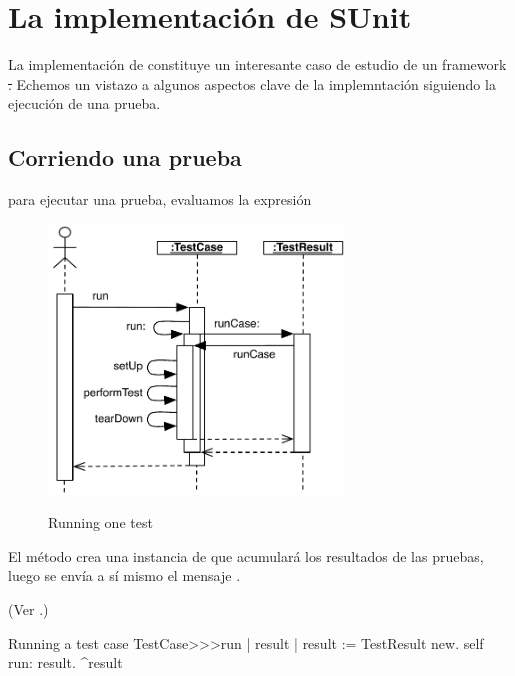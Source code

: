 \documentclass[a4paper,10pt,twoside]{book}
\begin{document}
\section{La implementaci\'on de SUnit}

La implementaci\'on de \sunit constituye un interesante caso de estudio de un framework \st. 
Echemos un vistazo a algunos aspectos clave de la implemntaci\'on siguiendo la ejecuci\'on de una prueba.

\subsection{Corriendo una prueba}

para ejecutar una prueba, evaluamos la expresi\'on


\begin{figure}[tbh]
  \begin{center}
		{\includegraphics[width=0.7\textwidth]{sunit-scenario}}
	\caption{Running one test}
  \end{center}
\end{figure}

El m\'etodo  crea una instancia de 
 que acumular\'a los resultados de las pruebas, luego se env\'ia a s\'i mismo el mensaje  .

(Ver .)

\begin{method}[tastecaserun]{Running a test case}
TestCase>>>run
	| result |
	result := TestResult new.
	self run: result.
	^result
\end{method}
\end{document}
